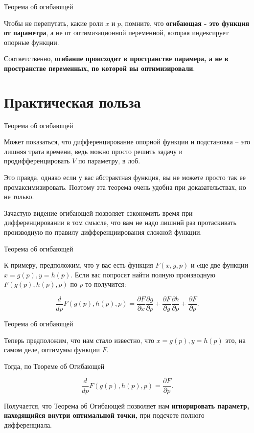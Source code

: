 \documentclass{beamer}
\begin{document}
\begin{frame}{Теорема об огибающей}

Чтобы не перепутать, какие роли $x$ и $p$, помните, что \textbf{огибающая - это функция от параметра}, а не от оптимизационной переменной, которая индексирует опорные функции. 

Соответственно, \textbf{огибание происходит в пространстве парамера, а не в пространстве переменных, по которой вы оптимизировали}.

\end{frame}

\section{Практическая польза}

\begin{frame}{Теорема об огибающей}

Может показаться, что дифференцирование опорной функции и подстановка – это лишняя трата времени, ведь можно просто решить задачу и продифференцировать $V$ по параметру, в лоб.

Это правда, однако если у вас абстрактная функция, вы не можете просто так ее промаксимизировать. Поэтому эта теорема очень удобна при доказательствах, но не только. 

Зачастую видение огибающей позволяет сэкономить время при дифференцировании в том смысле, что вам не надо лишний раз протаскивать производную по правилу дифференциирования сложной функции.

\end{frame}

\begin{frame}{Теорема об огибающей}

К примеру, предположим, что у вас есть функция $F(x, y, p)$ и eще две функции $x = g(p), y = h(p)$. Если вас попросят найти полную производную $F(g(p), h(p), p)$ по $p$ то получится:

$$\frac{d}{dp} F(g(p), h(p), p) = \frac{\partial F}{\partial x} \frac{\partial g}{\partial p} + \frac{\partial F}{\partial y} \frac{\partial h}{\partial p} + \frac{\partial F}{\partial p}.$$

\end{frame}

\begin{frame}{Теорема об огибающей}

Теперь предположим, что нам стало известно, что $x = g(p), y = h(p)$ это, на самом деле, оптимумы функции $F$. 

Тогда, по Теореме об Огибающей

$$\frac{d}{dp} F(g(p), h(p), p) = \frac{\partial F}{\partial p}.$$

Получается, что Теорема об Огибающей позволяет нам \textbf{игнорировать параметр, находящийся внутри оптимальной точки,} при подсчете полного дифференциала.

\end{frame}
\end{document}
